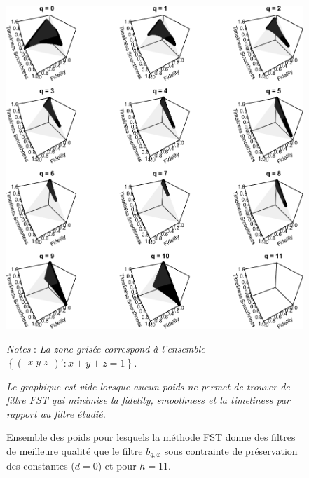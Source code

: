 \documentclass[
  11pt,
  french,
  a4paper]{article}
\newcommand\1{\mathds{1}}
\begin{document}
\begin{figure}[H]

{\centering \includegraphics{img/bookdown/pdf/rkhs11d0-1} 

}

\caption[Ensemble des poids pour lesquels la méthode FST donne des filtres de meilleure qualité que le filtre \(b_{q,\varphi}\) sous contrainte de préservation des constantes (\(d=0\)) et pour \(h=11\)]{Ensemble des poids pour lesquels la méthode FST donne des filtres de meilleure qualité que le filtre \(b_{q,\varphi}\) sous contrainte de préservation des constantes (\(d=0\)) et pour \(h=11\).}\label{fig:rkhs11d0}

\footnotesize


\emph{Notes} : \emph{La zone grisée correspond à l'ensemble \(\left\{\begin{pmatrix}x \; y \; z \end{pmatrix}' : x+y+z=1\right\}\).}

\emph{Le graphique est vide lorsque aucun poids ne permet de trouver de filtre FST qui minimise la \emph{fidelity}, \emph{smoothness} et la \emph{timeliness} par rapport au filtre étudié.}
\normalsize\end{figure}
\end{document}
